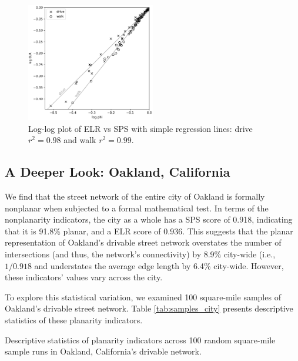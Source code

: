 \documentclass[Afour,sageh,times]{sagej}
\begin{document}
\begin{figure}[htbp]
    \center
    \includegraphics[width=0.5\textwidth]{regression_phi_split.png}
    \caption{Log-log plot of ELR vs SPS with simple regression lines: drive $r^2=0.98$ and walk $r^2=0.99$.}
    \label{fig:regression_split}
\end{figure}


\subsection{A Deeper Look: Oakland, California}

We find that the street network of the entire city of Oakland is formally nonplanar when subjected to a formal mathematical test. In terms of the nonplanarity indicators, the city as a whole has a SPS score of 0.918, indicating that it is 91.8\% planar, and a ELR score of 0.936. This suggests that the planar representation of Oakland's drivable street network overstates the number of intersections (and thus, the network's connectivity) by 8.9\% city-wide (i.e., $1 / 0.918$ and understates the average edge length by 6.4\% city-wide. However, these indicators' values vary across the city.

To explore this statistical variation, we examined 100 square-mile samples of Oakland's drivable street network. Table \ref{tab:samples_city} presents descriptive statistics of these planarity indicators. 



\begin{table}[htbp]
\centering
\caption{Descriptive statistics of planarity indicators across 100 random square-mile sample runs in Oakland, California's drivable network.}
\label{tab:samples_city}

\end{table}
\end{document}
